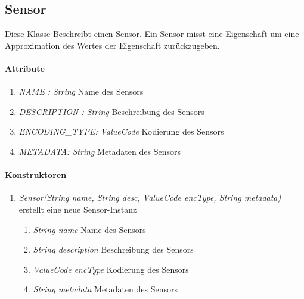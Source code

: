\subsection*{Sensor}\label{sensor}
Diese Klasse Beschreibt einen Sensor. Ein Sensor misst eine Eigenschaft um eine Approximation des Wertes der Eigenschaft zurückzugeben.
\paragraph{Attribute}
\begin{enumerate}[$\bullet$]
	\item \textit{NAME : String} Name des Sensors
	\item \textit{DESCRIPTION : String} Beschreibung des Sensors
	\item \textit{ENCODING\_TYPE: ValueCode} Kodierung des Sensors
	\item \textit{METADATA: String} Metadaten des Sensors
\end{enumerate}

\paragraph{Konstruktoren}
\begin{enumerate}[+]
	\item \textit{ Sensor(String name, String desc, ValueCode encType, String metadata)}
	erstellt eine neue Sensor-Instanz
	\begin{enumerate}[$\bullet$]
		\item \textit{String name} Name des Sensors
		\item \textit{String description} Beschreibung des Sensors
		\item \textit{ValueCode encType} Kodierung des Sensors
		\item \textit{String metadata} Metadaten des Sensors
	\end{enumerate}
	
\end{enumerate}
